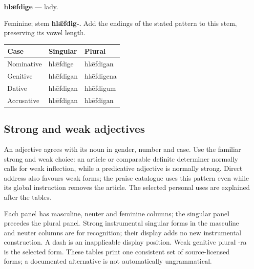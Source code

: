 \par\begin{minipage}{\linewidth}\raggedright
\textbf{hlǣfdige} — lady.

Feminine; stem \textbf{hlǣfdig-}. Add the endings of the stated pattern to this stem, preserving its vowel length.

\par\begingroup
\fontsize{10.5}{13.2}\selectfont
\setlength{\LTleft}{0pt}\setlength{\LTright}{\fill}
\noindent
\begin{tabular}{@{}>{\raggedright\arraybackslash}p{39.46mm}>{\raggedright\arraybackslash}p{39.46mm}>{\raggedright\arraybackslash}p{39.46mm}@{}}
\toprule
\textbf{Case} & \textbf{Singular} & \textbf{Plural} \\
\midrule
Nominative & hlǣfdige & hlǣfdigan \\
Genitive & hlǣfdigan & hlǣfdigena \\
Dative & hlǣfdigan & hlǣfdigum \\
Accusative & hlǣfdigan & hlǣfdigan \\
\bottomrule
\end{tabular}
\par\endgroup

\end{minipage}\par
{}
\subsection*{Strong and weak adjectives}

An adjective agrees with its noun in gender, number and case. Use the familiar strong and weak choice: an article or comparable definite determiner normally calls for weak inflection, while a predicative adjective is normally strong. Direct address also favours weak forms; the praise catalogue uses this pattern even while its global instruction removes the article. The selected personal uses are explained after the tables.

Each panel has masculine, neuter and feminine columns; the singular panel precedes the plural panel. Strong instrumental singular forms in the masculine and neuter columns are for recognition; their display adds no new instrumental construction. A dash is an inapplicable display position. Weak genitive plural -ra is the selected form. These tables print one consistent set of source-licensed forms; a documented alternative is not automatically ungrammatical.

